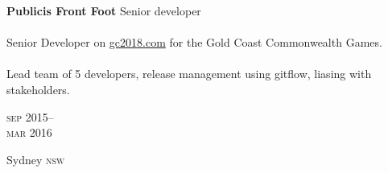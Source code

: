 \begin{minipage}[t]{\mainboxwidth\textwidth}
\textbf{Publicis Front Foot}\phantom{..} Senior developer \\
\\
{\small
Senior Developer on \href{https://www.gc2018.com/}{gc2018.com} 
for the Gold Coast Commonwealth Games.
\\
\\
Lead team of 5 developers, release management using
gitflow, liasing with stakeholders.}
\\
{\small
\textit{}
\par}
\end{minipage}
\begin{minipage}[t]{\detailboxwidth\textwidth}
{
\hfill \textsc{sep} 2015--\\ 
\hspace*{0pt} \hfill \textsc{mar} 2016
\par
{\small\hfill Sydney \textsc{nsw}}
}
\end{minipage}
\\





